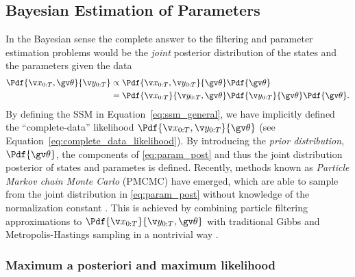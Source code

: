 \subsection{Bayesian Estimation of Parameters}%
In the Bayesian sense the complete 
answer to the filtering and parameter estimation problems would be the \emph{joint} posterior distribution of the states
and the parameters given the data
\begin{align}
\begin{split}
	\Pdf{\X,\Th}{\Y} &\propto \Pdf{\X,\Y}{\Th}\Pdf{\Th}\\
	&= \Pdf{\X}{\Y,\Th}\Pdf{\Y}{\Th}\Pdf{\Th}.
\end{split}
	\label{eq:param_post}
\end{align}
By defining the SSM in Equation~\eqref{eq:ssm_general}, we have
implicitly defined the ``complete-data'' likelihood $\Pdf{\X,\Y}{\Th}$
(see Equation~\eqref{eq:complete_data_likelihood}).
By introducing the \emph{prior distribution}, $\Pdf{\Th}$,
the components of \eqref{eq:param_post} and thus the joint distribution posterior
of states and parametes is defined. Recently, methods known as
\emph{Particle Markov chain Monte Carlo} (PMCMC) have emerged,
which are able to sample from the joint distribution in \eqref{eq:param_post}
without knowledge of the normalization constant \parencite{Andrieu2010}.
This is achieved by combining particle filtering approximations to $\Pdf{\X}{\Y,\Th}$ 
with traditional Gibbs and Metropolis-Hastings sampling in a nontrivial way 
\parencite{Andrieu2010,gelman2004}.

\subsubsection{Maximum a posteriori and maximum likelihood}

